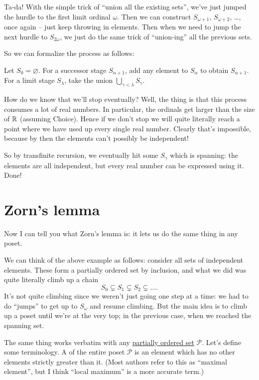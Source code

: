 Ta-da!
With the simple trick of ``union all the existing sets'',
we've just jumped the hurdle to the first limit ordinal $\omega$.
Then we can construct $S_{\omega+1}$, $S_{\omega+2}$, \dots, once again --
just keep throwing in elements.
Then when we need to jump the next hurdle to $S_{2 \omega}$,
we just do the same trick of ``union-ing'' all the previous sets.

So we can formalize the process as follows:
\begin{enumerate}
	\ii Let $S_0 = \varnothing$.
	\ii For a successor stage $S_{\alpha+1}$, add any element to $S_\alpha$ to obtain $S_{\alpha+1}$.
	\ii For a limit stage $S_{\lambda}$, take the union $\bigcup_{\gamma < \lambda} S_\gamma$.
\end{enumerate}
How do we know that we'll stop eventually?
Well, the thing is that this process consumes a lot of real numbers.
In particular, the ordinals get larger than the size of $\mathbb R$ (assuming Choice).
Hence if we don't stop we will quite literally reach a point where we have used up every single real number.
Clearly that's impossible, because by then the elements can't possibly be independent!

So by transfinite recursion, we eventually hit some $S_\gamma$ which is spanning:
the elements are all independent, but every real number can be expressed using it.
Done!


\section{Zorn's lemma}
Now I can tell you what Zorn's lemma is:
it lets us do the same thing in any poset.

We can think of the above example as follows:
consider all sets of independent elements.
These form a partially ordered set by inclusion, and what we did
was quite literally climb up a chain
\[ S_0 \subsetneq S_1 \subsetneq S_2 \subsetneq \dots. \]
It's not quite climbing since we weren't just going one step at a time:
we had to do ``jumps'' to get up to $S_\omega$ and resume climbing.
But the main idea is to climb up a poset until we're at the very top;
in the previous case, when we reached the spanning set.

The same thing works verbatim with any \href{http://en.wikipedia.org/wiki/Partially_ordered_set}{partially ordered set}
$\mathcal P$.
Let's define some terminology.
A  of the entire poset $\mathcal P$ is an element
which has no other elements strictly greater than it.
(Most authors refer to this as ``maximal element'', but I think
``local maximum'' is a more accurate term.)

